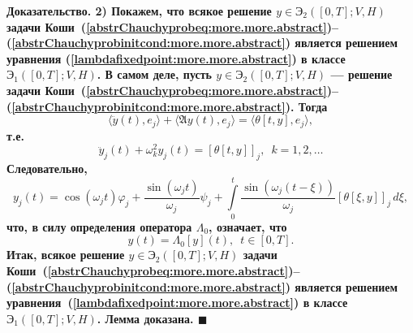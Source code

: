 \documentclass{report}
\newenvironment{Proof}{\par\noindent\bf Доказательство.\rm}{ $\blacksquare$\par}
\begin{document}
\begin{Proof}
2) Покажем, что всякое решение $y\in{\textbf{Э}}_2([0,T];V,H)$ задачи Коши~(\ref{abstrChauchyprobeq:more.more.abstract})--(\ref{abstrChauchyprobinitcond:more.more.abstract}) является
решением уравнения (\ref{lambdafixedpoint:more.more.abstract}) в классе ${\textbf{Э}}_1([0,T];V,H)$. В самом деле, пусть $y\in{\textbf{Э}}_2([0,T];V,H)$ --- решение задачи
Коши~(\ref{abstrChauchyprobeq:more.more.abstract})--(\ref{abstrChauchyprobinitcond:more.more.abstract}). Тогда
$$
\langle\ddot y(t),e_j\rangle+\langle \mathfrak{A}y(t),e_j\rangle=\langle\theta[t,y],e_j\rangle,
$$
т.е.
$$
\ddot y_j(t)+\omega_k^2y_j(t)=[\theta[t,y]]_j,\,\,\,k=1,2,\dots
$$
Следовательно,
$$
y_j(t)=\cos(\omega_jt)\varphi_j+\frac{\sin(\omega_jt)}{\omega_j}\psi_j+\int\limits_{0}^t\frac{\sin(\omega_j(t-\xi))}{\omega_j}[\theta[\xi,y]]_j\,d\xi,
$$
что, в силу определения оператора $\Lambda_0$, означает, что
$$
y(t)=\Lambda_0[y](t),\,\,\,t\in[0,T].
$$
Итак, всякое решение $y\in{\textbf{Э}}_2([0,T];V,H)$ задачи Коши~(\ref{abstrChauchyprobeq:more.more.abstract})--(\ref{abstrChauchyprobinitcond:more.more.abstract}) является решением
уравнения~(\ref{lambdafixedpoint:more.more.abstract}) в классе ${\textbf{Э}}_1([0,T];V,H)$. Лемма доказана.
\end{Proof}
\end{document}
